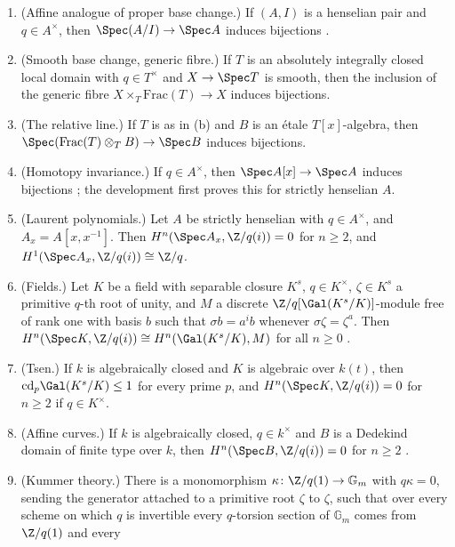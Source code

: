 \begin{proposition}\label{prop:pf:steps2:etfound}
\begin{enumerate}[label=\textup{(\alph*)},leftmargin=2.2em]
\item (Affine analogue of proper base change.) If $(A,I)$ is a henselian pair and $q\in A^\times$,
  then $\Spec(A/I)\to\Spec A$ induces bijections \cite{Gabber1994}.
\item (Smooth base change, generic fibre.) If $T$ is an absolutely integrally closed local domain with
  $q\in T^\times$ and $X\to\Spec T$ is smooth, then the inclusion of the generic fibre
  $X\times_T\mathrm{Frac}(T)\to X$ induces bijections.
\item (The relative line.) If $T$ is as in (b) and $B$ is an \'etale $T[x]$-algebra, then
  $\Spec(\mathrm{Frac}(T)\otimes_TB)\to\Spec B$ induces bijections.
\item (Homotopy invariance.) If $q\in A^\times$, then $\Spec A[x]\to\Spec A$ induces bijections
  \cite[Exp.~XV, 2.2]{ArtinGrothendieckVerdier1972}; the development first proves this for strictly
  henselian $A$.
\item (Laurent polynomials.) Let $A$ be strictly henselian with $q\in A^\times$, and
  $A_x=A[x,x^{-1}]$. Then $H^n(\Spec A_x,\Z/q(i))=0$ for $n\ge2$, and
  $H^1(\Spec A_x,\Z/q(i))\cong\Z/q$.
\item (Fields.) Let $K$ be a field with separable closure $K^s$, $q\in K^\times$, $\zeta\in K^s$ a
  primitive $q$-th root of unity, and $M$ a discrete $\Z/q[\Gal(K^s/K)]$-module free of rank one with
  basis $b$ such that $\sigma b=a^ib$ whenever $\sigma\zeta=\zeta^a$. Then $H^n(\Spec K,\Z/q(i))\cong H^n(\Gal(K^s/K),M)$ for all $n\ge0$
  \cite[Exp.~VIII, 2.1--2.3]{ArtinGrothendieckVerdier1972}.
\item (Tsen.) If $k$ is algebraically closed and $K$ is algebraic over $k(t)$, then
  $\mathrm{cd}_p\Gal(K^s/K)\le1$ for every prime $p$, and $H^n(\Spec K,\Z/q(i))=0$ for $n\ge2$ if $q\in
  K^\times$.
\item (Affine curves.) If $k$ is algebraically closed, $q\in k^\times$ and $B$ is a Dedekind domain of
  finite type over $k$, then $H^n(\Spec B,\Z/q(i))=0$ for $n\ge2$
  \cite[Exp.~IX, 5.7]{ArtinGrothendieckVerdier1972}.
\item (Kummer theory.) There is a monomorphism $\kappa\colon\Z/q(1)\to\mathbb G_m$ with $q\kappa=0$,
  sending the generator attached to a primitive root $\zeta$ to $\zeta$, such that over every scheme on
  which $q$ is invertible every $q$-torsion section of $\mathbb G_m$ comes from $\Z/q(1)$ and every

\end{enumerate}
\end{proposition}
